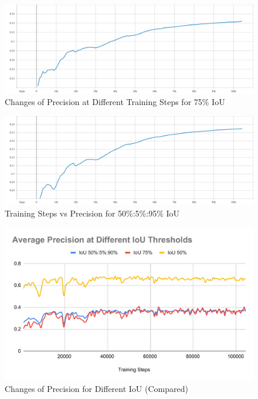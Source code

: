             \begin{figure}
                \centering
                \includegraphics[width=\textwidth]{images/mAP-75-IoU.pdf}
                \caption{Changes of Precision at Different Training Steps for 75\% IoU}
                \label{fig:precision_iou75}
            \end{figure}
            
            \begin{figure}
                \centering
                \includegraphics[width=\textwidth]{images/mAP.pdf}
                \caption{Training Steps vs Precision for 50\%:5\%:95\% IoU}
                \label{fig:precision_ioucoco}
            \end{figure}
            
            \begin{figure}
                \centering
                \includegraphics[width=\textwidth]{images/Average Precision at Different IoU Thresholds.pdf}
                \caption{Changes of Precision for Different IoU (Compared)}
                \label{fig:precision_iou}
            \end{figure}
            
